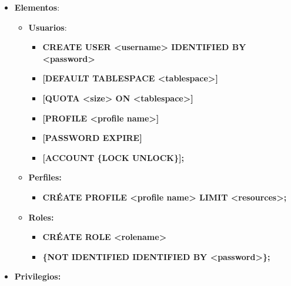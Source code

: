 \documentclass[12pt, twoside, openright]{report} %
\begin{document}
  \begin{itemize}
  \item \textbf{Elementos}:
    

    \begin{itemize}
    \item \textbf{Usuarios}:
      

      \begin{itemize}
      \item \textbf{CREATE USER \textless username\textgreater{} IDENTIFIED
        BY \textless password\textgreater{}}
        
      \item \textbf{{[}DEFAULT TABLESPACE
        \textless tablespace\textgreater{]}}
        
      \item \textbf{{[}QUOTA \textless size\textgreater{} ON
        \textless tablespace\textgreater{]}}
        
      \item \textbf{{[}PROFILE \textless profile name\textgreater{]}}
        
      \item \textbf{{[}PASSWORD EXPIRE{]}}
        
      \item \textbf{{[}ACCOUNT \{LOCK \textbar{} UNLOCK\}{]};}
        
      \end{itemize}
    \item \textbf{Perfiles:}
      

      \begin{itemize}
      \item \textbf{CRÉATE PROFILE \textless profile name\textgreater{}
        LIMIT \textless resources\textgreater;}
        
      \end{itemize}
    \item \textbf{Roles:}
      

      \begin{itemize}
      \item \textbf{CRÉATE ROLE \textless rolename\textgreater{}}
        
      \item \textbf{\{NOT IDENTIFIED \textbar{} IDENTIFIED BY
        \textless password\textgreater\};}
        
      \end{itemize}
    \end{itemize}
  \item \textbf{Privilegios:}
    


\end{itemize}
\end{document}

